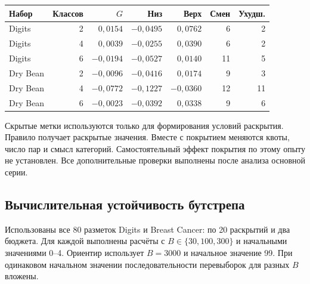 \begingroup\small
\begin{exampletable}\small
\caption{Состав разметки при m=20. По 20 раскрытий, условные 95\%-интервалы среднего.}\label{tab:coverage-control}
\begin{tabular}{lrrrrrr}
\toprule Набор & Классов & $G$ & Низ & Верх & Смен & Ухудш.\\\midrule

Digits & 2 & $0{,}0154$ & $-0{,}0495$ & $0{,}0762$ & 6 & 2\\
Digits & 4 & $0{,}0039$ & $-0{,}0255$ & $0{,}0390$ & 6 & 2\\
Digits & 6 & $-0{,}0194$ & $-0{,}0527$ & $0{,}0140$ & 11 & 5\\
Dry Bean & 2 & $-0{,}0096$ & $-0{,}0416$ & $0{,}0174$ & 9 & 3\\
Dry Bean & 4 & $-0{,}0772$ & $-0{,}1227$ & $-0{,}0360$ & 12 & 11\\
Dry Bean & 6 & $-0{,}0023$ & $-0{,}0392$ & $0{,}0338$ & 9 & 6\\
\bottomrule\end{tabular}
\end{exampletable}
\endgroup
Скрытые метки используются только для формирования условий раскрытия. Правило получает раскрытые значения. Вместе с покрытием меняются квоты, число пар и смысл категорий. Самостоятельный эффект покрытия по этому опыту не установлен. Все дополнительные проверки выполнены после анализа основной серии.

\subsection{Вычислительная устойчивость бутстрепа}
Использованы все 80 разметок Digits и Breast Cancer: по 20 раскрытий и два бюджета. Для каждой выполнены расчёты с $B\in\{30,100,300\}$ и начальными значениями 0--4. Ориентир использует $B=3000$ и начальное значение 99. При одинаковом начальном значении последовательности перевыборок для разных $B$ вложены.

